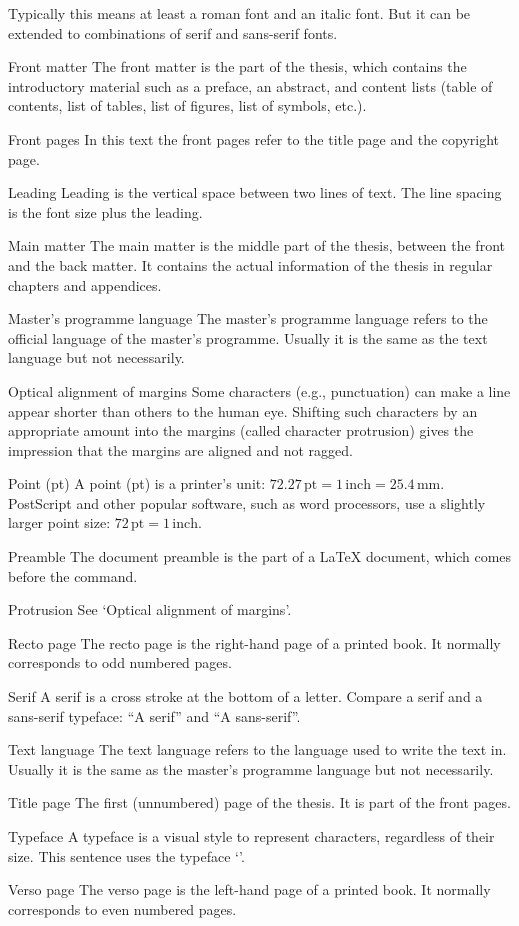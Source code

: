 \begin{termlist}
  Typically this means at least a roman font and an italic font. But it can
  be extended to combinations of serif and sans-serif fonts.
\item[Front matter]
  The front matter is the part of the thesis, which contains the
  introductory material such as a preface, an abstract, and content lists
  (table of contents, list of tables, list of figures, list of symbols, etc.).
\item[Front pages]
  In this text the front pages refer to the title page and the copyright page.
\item[Leading]
  Leading is the vertical space between two lines of text. The line spacing
  is the font size plus the leading.
\item[Main matter]
  The main matter is the middle part of the thesis, between the front and
  the back matter. It contains the actual information of the thesis in
  regular chapters and appendices.
\item[Master's programme language]
  The master's programme language refers to the official language of the
  master's programme. Usually it is the same as the text language but not
  necessarily.
\item[Optical alignment of margins]
  Some characters (e.g., punctuation) can make a line appear shorter than
  others to the human eye. Shifting such characters by an appropriate
  amount into the margins (called character protrusion) gives the impression
  that the margins are aligned and not ragged.
\item[Point (pt)]
  A point (pt) is a printer's unit: $72.27\,\mathrm{pt} = 1\,\mathrm{inch} =
  25.4\,\mathrm{mm}$. PostScript and other popular software, such as word
  processors, use a slightly larger point size: $72\,\mathrm{pt} =
  1\,\mathrm{inch}$.
\item[Preamble \latex]
  The document preamble is the part of a LaTeX document, which comes before
  the \verb"" command.
\item[Protrusion]
  See `Optical alignment of margins'.
\item[Recto page]
  The recto page is the right-hand page of a printed book. It normally
  corresponds to odd numbered pages.
\item[Serif]
  A serif is a cross stroke at the bottom of a letter. Compare a serif and
  a sans-serif typeface: ``{\selectfont A serif}'' and
  ``{\selectfont A sans-serif}''.
\item[Text language]
  The text language refers to the language used to write the text in.
  Usually it is the same as the master's programme language but not necessarily.
\item[Title page]
  The first (unnumbered) page of the thesis. It is part of the front pages.
\item[Typeface]
  A typeface is a visual style to represent characters, regardless of their
  size. This sentence uses the typeface `\rmfontname'. 
\item[Verso page]
  The verso page is the left-hand page of a printed book. It normally
  corresponds to even numbered pages.
\end{termlist}

